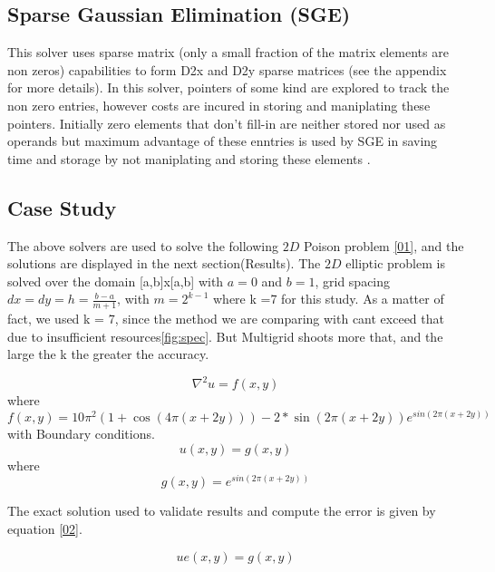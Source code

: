 \documentclass[12pt,a4paper]{article}
\begin{document}
	\subsection{Sparse Gaussian Elimination (SGE)}
	This solver uses sparse matrix (only a small fraction of the matrix elements are non zeros) capabilities to form D2x and D2y sparse matrices (see the appendix for more details). In this solver, pointers of some kind are explored to track the non zero entries, however costs are incured in storing and maniplating these pointers. Initially zero elements that don't fill-in are neither stored nor used as operands but  maximum advantage of these enntries is used by SGE in saving time and storage by not maniplating and storing these elements \cite{brayton1970some}.
	
	\subsection{Case Study}
	The above solvers are used to solve the following $2D$ Poison  problem \eqref{01}, and the solutions are displayed in the next section(Results).  The $2D$ elliptic problem is solved over the domain [a,b]x[a,b] with $a=0$ and $b=1$, grid spacing $dx=dy=h=\frac{b-a}{m+1}$, with $m=2^{k-1}$ where k =7 for this study. As a matter of fact, we used k = 7, since the method we are comparing with cant exceed that due to insufficient resources\ref{fig:spec}. But  Multigrid shoots more that, and the large the k the greater the accuracy.
	
	\begin{equation}
		\nabla ^{2} u = f(x,y)
		\label{01}
	\end{equation}
	where 
	$$f(x,y) = 10\pi^{2} (1+ \cos(4\pi(x+2y))) -2*\sin(2\pi(x+2y)) e^{sin(2\pi(x+2y))} $$
	with Boundary conditions.
	$$u(x,y) = g(x,y) $$
	where 
	$$g(x,y) = e^{sin(2\pi(x+2y))} $$
	
		\noindent The exact solution used to validate results and compute the error is given by equation \eqref{02}.
	
	\begin{equation}
		ue(x,y) = g(x,y)
		\label{02}
	\end{equation}
	
	\newpage
\end{document}
